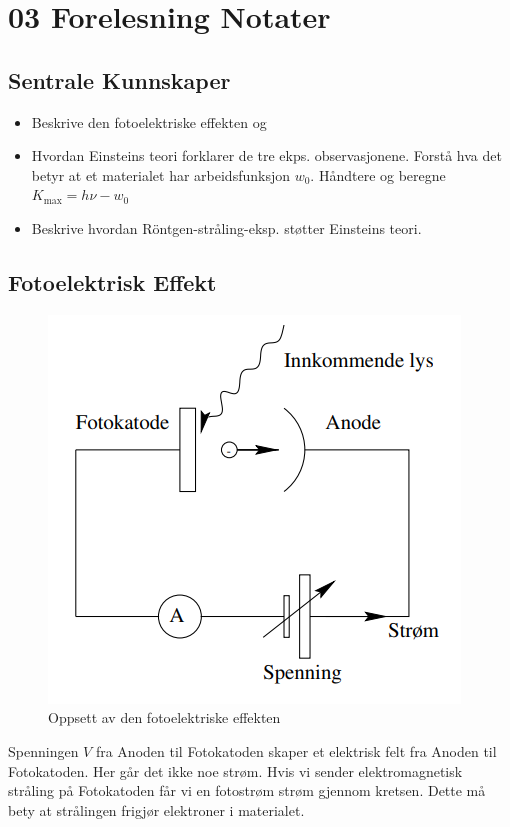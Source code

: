 \chapter{03 Forelesning Notater}
\section{Sentrale Kunnskaper}
\begin{itemize}
    \item Beskrive den fotoelektriske effekten og 
    \item Hvordan Einsteins teori forklarer de tre ekps. observasjonene. Forstå hva det betyr at et materialet har arbeidsfunksjon $w_0$. Håndtere og beregne $K_{\text{max}} = hν - w_0$
    \item Beskrive hvordan Röntgen-stråling-eksp. støtter Einsteins teori.
\end{itemize}
\section{Fotoelektrisk Effekt}


\begin{figure}[h!]
  \centering
  \includegraphics[scale = .5]{Figures/Fotoeletkrisk effekt oppsett.png}
  \caption{Oppsett av den fotoelektriske effekten}
  \label{fig: Fotoelektrisk effekt oppsett}
\end{figure}
Spenningen $V$ fra Anoden til Fotokatoden skaper et elektrisk felt fra Anoden til Fotokatoden. Her går det ikke noe strøm. Hvis vi sender elektromagnetisk stråling på Fotokatoden får vi en fotostrøm strøm gjennom kretsen. Dette må bety at strålingen frigjør elektroner i materialet.

